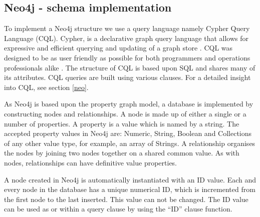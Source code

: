 \subsection{Neo4j - schema implementation}
To implement a Neo4j structure we use a query language namely Cypher Query Language (CQL). Cypher, is a declarative graph query language that allows for expressive and efficient querying and updating of a graph store \cite{nd}. CQL was designed to be as user friendly as possible for both programmers and operations professionals alike \cite{nd}. The structure of CQL is based upon SQL and shares many of its attributes. CQL queries are built using various clauses. For a detailed insight into CQL, see section \ref{neo}.

As Neo4j is based upon the property graph model, a database is implemented by constructing nodes and relationships. A node is made up of either a single or a number of properties. A property is a value which is named by a string. The accepted property values in Neo4j are: Numeric, String, Boolean and Collections of any other value type, for example, an array of Strings. A relationship organises the nodes by joining two nodes together on a shared common value. As with nodes, relationships can have definitive value properties.

A node created in Neo4j is automatically instantiated with an ID value. Each and every node in the database has a unique numerical ID, which is incremented from the first node to the last inserted. This value can not be changed. The ID value can be used as or within a query clause by using the ``ID'' clause function.

